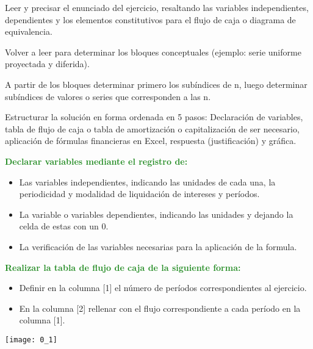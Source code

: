 \begin{enumerate}
    \item Leer y precisar el enunciado del ejercicio, resaltando las variables independientes, dependientes y los elementos constitutivos para el flujo de caja o diagrama de equivalencia. 
    \item Volver a leer para determinar los bloques conceptuales (ejemplo: serie uniforme proyectada y diferida).
    \item A partir de los bloques determinar primero los subíndices de n, luego determinar subíndices de valores o series que corresponden a las n.
    \item Estructurar la solución en forma ordenada en 5 pasos: Declaración de variables, tabla de flujo de caja o tabla de amortización o capitalización de ser necesario, aplicación de fórmulas financieras en Excel, respuesta (justificación) y gráfica.
    \textcolor{ForestGreen}{\item \textbf{Declarar variables mediante el registro de:}}
    \begin{itemize}
        \color{ForestGreen}
        \item Las variables independientes, indicando las unidades de cada una, la periodicidad y modalidad de liquidación de intereses y períodos.
        \item La variable o variables dependientes, indicando las unidades y dejando la celda de estas con un 0.
        \item La verificación de las variables necesarias para la aplicación de la formula.
    \end{itemize}
    \textcolor{ForestGreen}{\item \textbf{Realizar la tabla de flujo de caja de la siguiente forma:}}
    \begin{itemize}
        \color{ForestGreen}
        \item Definir en la columna [1] el número de períodos correspondientes al ejercicio.
        \item En la columna [2] rellenar con el flujo correspondiente a cada período en la columna [1]. 
    \end{itemize}
    \begin{center}
    \texttt{[image: 0\_1]}
    \end{center}
    

\end{enumerate}
